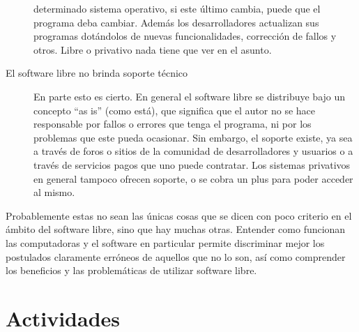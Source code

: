 \begin{description}
        determinado sistema operativo, si este último cambia, puede que el
        programa deba cambiar. Además los desarrolladores actualizan sus
        programas dotándolos de nuevas funcionalidades, corrección de fallos y
        otros. Libre o privativo nada tiene que ver en el asunto.
    \item[El software libre no brinda soporte técnico]
        En parte esto es cierto. En general el software libre se distribuye bajo
        un concepto ``as is'' (como está), que significa que el autor no se hace
        responsable por fallos o errores que tenga el programa, ni por los
        problemas que este pueda ocasionar. Sin embargo, el soporte existe, ya
        sea a través de foros o sitios de la comunidad de desarrolladores y
        usuarios o a través de servicios pagos que uno puede contratar. Los
        sistemas privativos en general tampoco ofrecen soporte, o se cobra un
        plus para poder acceder al mismo.
\end{description}

Probablemente estas no sean las únicas cosas que se dicen con poco criterio en
el ámbito del software libre, sino que hay muchas otras. Entender como funcionan
las computadoras y el software en particular permite discriminar mejor los
postulados claramente erróneos de aquellos que no lo son, así como comprender
los beneficios y las problemáticas de utilizar software libre.

\section{Actividades}
\label{chap:informatica:sec:actividades}


